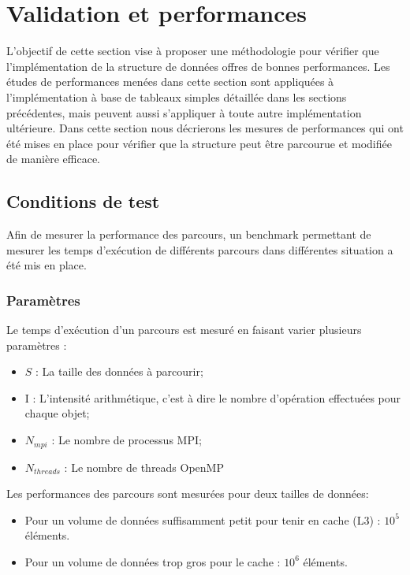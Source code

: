 \section{Validation et performances}

L'objectif de cette section vise à proposer une méthodologie pour vérifier que l'implémentation de la structure de données offres de bonnes performances. Les études de performances menées dans cette section sont appliquées à l'implémentation à base de tableaux simples détaillée dans les sections précédentes, mais peuvent aussi s'appliquer à toute autre implémentation ultérieure. Dans cette section nous décrierons les mesures de performances qui ont été mises en place pour vérifier que la structure peut être parcourue et modifiée de manière efficace.

\subsection{Conditions de test}

Afin de mesurer la performance des parcours, un benchmark permettant de mesurer les temps d'exécution de différents parcours dans différentes situation a été mis en place.

\subsubsection{Paramètres}

Le temps d'exécution d'un parcours est mesuré en faisant varier plusieurs paramètres :
\begin{itemize}
	\item $S$ : La taille des données à parcourir;
	\item I : L'intensité arithmétique, c'est à dire le nombre d'opération effectuées pour chaque objet;
	\item $N_{mpi}$ : Le nombre de processus MPI;
	\item $N_{threads}$ : Le nombre de threads OpenMP
\end{itemize}

Les performances des parcours sont mesurées pour deux tailles de données:
\begin{itemize}
    \item Pour un volume de données suffisamment petit pour tenir en cache (L3) : $10^5$ éléments.
    \item Pour un volume de données trop gros pour le cache : $10^6$ éléments.
\end{itemize}

